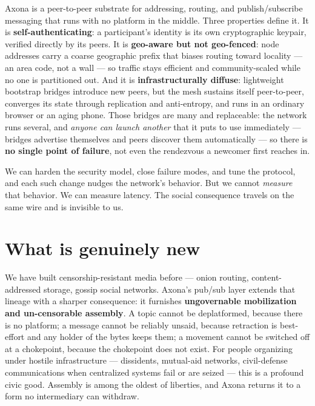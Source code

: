 \documentclass[nobib]{tufte-handout}
\begin{document}
Axona is a peer-to-peer substrate for addressing, routing, and
publish/subscribe messaging that runs with no platform in the middle. Three
properties define it. It is \textbf{self-authenticating}: a participant's
identity is its own cryptographic keypair, verified directly by its
peers. It
is \textbf{geo-aware but not geo-fenced}: node addresses carry a coarse
geographic prefix that biases routing toward locality --- an area code, not a
wall --- so traffic stays efficient and community-scaled while no one is
partitioned out. And it is \textbf{infrastructurally diffuse}: lightweight
bootstrap bridges introduce new peers, but the mesh sustains itself
peer-to-peer, converges its state through replication and anti-entropy, and runs
in an ordinary browser or an aging phone. Those bridges are many and replaceable: the network runs several, and
\emph{anyone can launch another} that it puts to use immediately --- bridges
advertise themselves and peers discover them automatically --- so there is
\textbf{no single point of failure}, not even the rendezvous a newcomer first
reaches in.

We can harden the security model, close failure modes, and tune the protocol,
and each such change nudges the network's behavior. But we cannot \emph{measure}
that behavior. We can measure latency. The social consequence travels on the
same wire and is invisible to us.

\section*{What is genuinely new}

We have built censorship-resistant media before --- onion routing,
content-addressed storage, gossip social networks. Axona's pub/sub layer
extends that lineage with a sharper consequence: it furnishes \textbf{ungovernable
mobilization and un-censorable assembly}. A topic cannot be deplatformed,
because there is no platform; a message cannot be reliably unsaid, because
retraction is best-effort and any holder of the bytes keeps them; a movement
cannot be switched off at a chokepoint, because the chokepoint does not exist.
For people organizing under hostile infrastructure --- dissidents, mutual-aid
networks, civil-defense communications when centralized systems fail or are
seized --- this is a profound civic good. Assembly is among the oldest of
liberties, and Axona returns it to a form no intermediary can withdraw.
\end{document}
